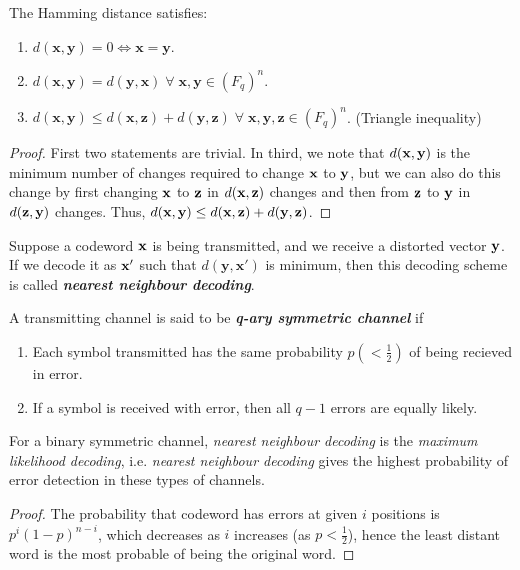 \documentclass[../main.tex]{subfiles}
\begin{document}
\begin{thm}
	The Hamming distance satisfies:
	\begin{enumerate}[label=(\roman*)]
		\itemsep-1mm
		\item $d(\textbf{x},\textbf{y}) = 0 \iff \textbf{x}=\textbf{y}$.
		\item $d(\textbf{x},\textbf{y}) = d(\textbf{y},\textbf{x})\; \forall \; 					  \textbf{x},\textbf{y} \in (F_q)^n$.
		\item $d(\textbf{x},\textbf{y}) \leq d(\textbf{x},\textbf{z}) + d(\textbf{y},				  \textbf{z})\; \forall \; \textbf{x},\textbf{y},\textbf{z} \in (F_q)^n$.
				(Triangle inequality)  
	\end{enumerate}
\end{thm}
\begin{proof}
	First two statements are trivial. In third, we note that $d(\textbf{x},\textbf{y})$ is the minimum number of changes required to change $\textbf{x}$ to $\textbf{y}$, but we can also do this change by first changing $\textbf{x}$ to $\textbf{z}$ in $d(\textbf{x},\textbf{z})$ changes and then from $\textbf{z}$ to $\textbf{y}$ in $d(\textbf{z},\textbf{y})$ changes. Thus, $d(\textbf{x},\textbf{y})\leq d(\textbf{x},\textbf{z}) + d(\textbf{y},\textbf{z})$.    	
\end{proof}

Suppose a codeword $\textbf{x}$ is being transmitted, and we receive a distorted vector $\textbf{y}$. If we decode it as $\textbf{x}'$ such that $d(\textbf{y},\textbf{x}')$ is minimum, then this decoding scheme is called \textbf{\emph{nearest neighbour decoding}}.\\ 
\begin{defn}
	A transmitting channel is said to be \textbf{\emph{q-ary symmetric channel}} if
	\begin{enumerate}
	\itemsep-1mm
	\item Each symbol transmitted has the same probability $p (<\frac{1}{2})$ of being recieved in error.
	\item If a symbol is received with error, then all $q-1$ errors are equally likely.
	\end{enumerate}
\end{defn}

\begin{thm}
	For a binary symmetric channel, \emph{nearest neighbour decoding} is the \emph{maximum likelihood decoding}, i.e. \emph{nearest neighbour decoding} gives the highest probability of error detection in these types of channels.
\end{thm}

\begin{proof}
	The probability that codeword has errors at given $i$ positions is $p^i(1-p)^{n-i}$, which decreases as $i$ increases (as $p < \frac{1}{2}$), hence the least distant word is the most probable of being the original word. 
\end{proof}
\end{document}
